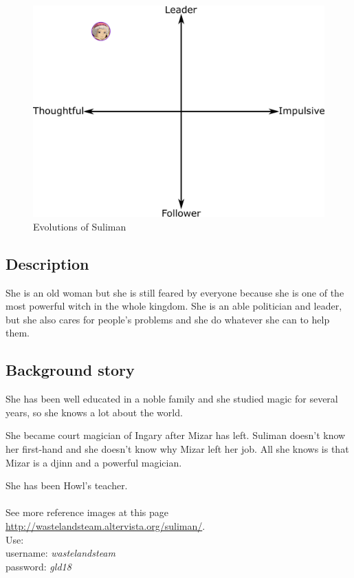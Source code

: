 \begin{figure}[H]
  \centering
   \includegraphics[width=14cm]{Images/Diagrams/Evolutions/sulimanEvolution}
  \caption{Evolutions of Suliman}
\end{figure}

\subsection{Description}
She is an old woman but she is still feared by everyone because she is one of the most powerful witch in the whole kingdom. She is an able politician and leader, but she also cares for people's problems and she do whatever she can to help them.

\subsection{Background story}
She has been well educated in a noble family and she studied magic for several years, so she knows a lot about the world.

She became court magician of Ingary after Mizar has left. Suliman doesn't know her first-hand and she doesn't know why Mizar left her job. All she knows is that Mizar is a djinn and a powerful magician.

She has been Howl's teacher.\\\\
See more reference images at this page \href{http://wastelandsteam.altervista.org/suliman/}{http://wastelandsteam.altervista.org/suliman/}.\\
Use:\\
username: \textit{wastelandsteam}\\
password: \textit{gld18}
